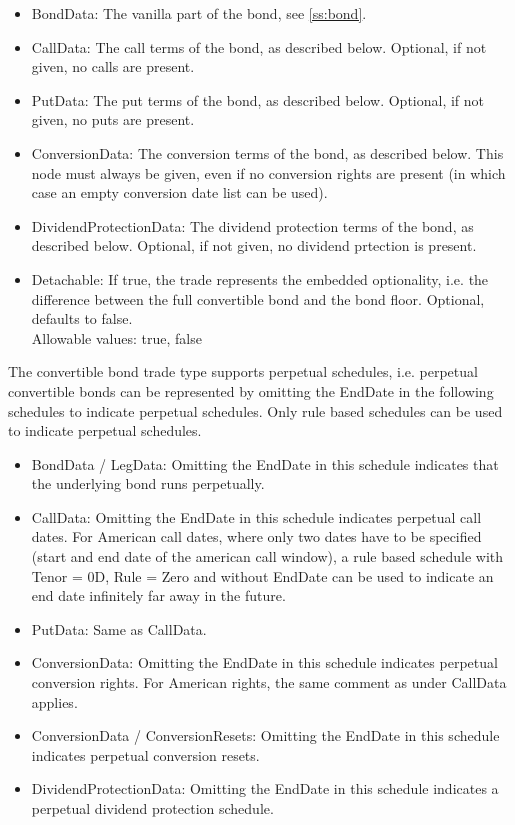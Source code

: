\begin{itemize}
  \item BondData: The vanilla part of the bond, see \ref{ss:bond}.
  \item CallData: The call terms of the bond, as described below. Optional, if not given, no calls are present.
  \item PutData: The put terms of the bond, as described below. Optional, if not given, no puts are present.
  \item ConversionData: The conversion terms of the bond, as described below. This node must always be given, even if no
    conversion rights are present (in which case an empty conversion date list can be used).
  \item DividendProtectionData: The dividend protection terms of the bond, as described below. Optional, if not given,
    no dividend prtection is present.
  \item Detachable: If true, the trade represents the embedded optionality, i.e. the difference between the full
    convertible bond and the bond floor. Optional, defaults to false. \\
    Allowable values: true, false
\end{itemize}

The convertible bond trade type supports perpetual schedules, i.e. perpetual convertible bonds can be represented by
omitting the EndDate in the following schedules to indicate perpetual schedules. Only rule based schedules can be used
to indicate perpetual schedules.

\begin{itemize}
\item BondData / LegData: Omitting the EndDate in this schedule indicates that the underlying bond runs perpetually.
\item CallData: Omitting the EndDate in this schedule indicates perpetual call dates. For American call dates, where
  only two dates have to be specified (start and end date of the american call window), a rule based schedule with Tenor
  = 0D, Rule = Zero and without EndDate can be used to indicate an end date infinitely far away in the future.
\item PutData: Same as CallData.
\item ConversionData: Omitting the EndDate in this schedule indicates perpetual conversion rights. For American rights,
  the same comment as under CallData applies.
\item ConversionData / ConversionResets: Omitting the EndDate in this schedule indicates perpetual conversion resets.
\item DividendProtectionData: Omitting the EndDate in this schedule indicates a perpetual dividend protection schedule.
\end{itemize}

